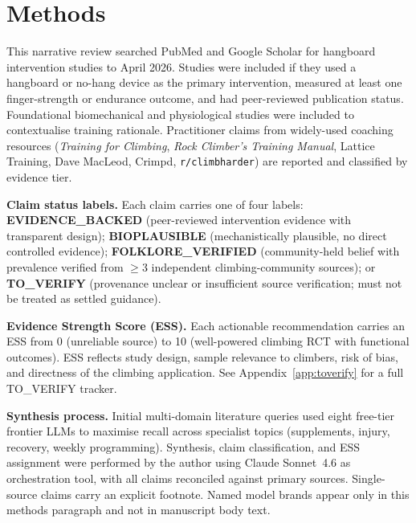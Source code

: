 \section{Methods}

This narrative review searched PubMed and Google Scholar for hangboard intervention studies to April 2026. Studies were included if they used a hangboard or no-hang device as the primary intervention, measured at least one finger-strength or endurance outcome, and had peer-reviewed publication status. Foundational biomechanical and physiological studies were included to contextualise training rationale. Practitioner claims from widely-used coaching resources (\textit{Training for Climbing}, \textit{Rock Climber's Training Manual}, Lattice Training, Dave MacLeod, Crimpd, \texttt{r/climbharder}) are reported and classified by evidence tier.

\textbf{Claim status labels.} Each claim carries one of four labels: \textbf{EVIDENCE\_BACKED} (peer-reviewed intervention evidence with transparent design); \textbf{BIOPLAUSIBLE} (mechanistically plausible, no direct controlled evidence); \textbf{FOLKLORE\_VERIFIED} (community-held belief with prevalence verified from $\geq$3 independent climbing-community sources); or \textbf{TO\_VERIFY} (provenance unclear or insufficient source verification; must not be treated as settled guidance).

\textbf{Evidence Strength Score (ESS).} Each actionable recommendation carries an ESS from 0 (unreliable source) to 10 (well-powered climbing RCT with functional outcomes). ESS reflects study design, sample relevance to climbers, risk of bias, and directness of the climbing application. See Appendix~\ref{app:toverify} for a full TO\_VERIFY tracker.

\textbf{Synthesis process.} Initial multi-domain literature queries used eight free-tier frontier LLMs to maximise recall across specialist topics (supplements, injury, recovery, weekly programming). Synthesis, claim classification, and ESS assignment were performed by the author using Claude Sonnet~4.6 as orchestration tool, with all claims reconciled against primary sources. Single-source claims carry an explicit footnote. Named model brands appear only in this methods paragraph and not in manuscript body text.
